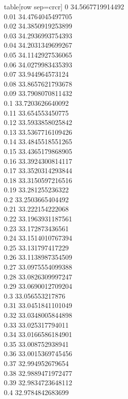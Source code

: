   table[row sep=crcr]{%
0	34.5667719914492\\
0.01	34.4764045497705\\
0.02	34.3850919253899\\
0.03	34.2936993754393\\
0.04	34.2031349699267\\
0.05	34.1142927536065\\
0.06	34.0279983435393\\
0.07	33.944964573124\\
0.08	33.8657621793678\\
0.09	33.7908070811432\\
0.1	33.7203626640092\\
0.11	33.654553450775\\
0.12	33.5933858025842\\
0.13	33.5367716109426\\
0.14	33.4845518551265\\
0.15	33.4365179868905\\
0.16	33.3924300814117\\
0.17	33.3520314293844\\
0.18	33.3150597216516\\
0.19	33.281255236322\\
0.2	33.2503665404492\\
0.21	33.222154222068\\
0.22	33.1963931187561\\
0.23	33.172873436561\\
0.24	33.1514010767394\\
0.25	33.131797417229\\
0.26	33.1138987354509\\
0.27	33.0975554099388\\
0.28	33.0826309997247\\
0.29	33.0690012709204\\
0.3	33.056553217876\\
0.31	33.0451841101049\\
0.32	33.0348005844898\\
0.33	33.025317794011\\
0.34	33.0166586184901\\
0.35	33.008752938941\\
0.36	33.0015369745456\\
0.37	32.994952679654\\
0.38	32.9889471972477\\
0.39	32.9834723648112\\
0.4	32.9784842683699\\
}
